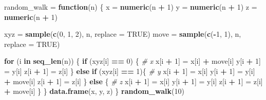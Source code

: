 \documentclass[
]{article}
\newenvironment{Shaded}{\begin{snugshade}}{\end{snugshade}}
\newcommand{\CommentTok}[1]{\textcolor[rgb]{0.56,0.35,0.01}{\textit{#1}}}
\newcommand{\ControlFlowTok}[1]{\textcolor[rgb]{0.13,0.29,0.53}{\textbf{#1}}}
\newcommand{\DataTypeTok}[1]{\textcolor[rgb]{0.13,0.29,0.53}{#1}}
\newcommand{\DecValTok}[1]{\textcolor[rgb]{0.00,0.00,0.81}{#1}}
\newcommand{\KeywordTok}[1]{\textcolor[rgb]{0.13,0.29,0.53}{\textbf{#1}}}
\newcommand{\NormalTok}[1]{#1}
\newcommand{\OperatorTok}[1]{\textcolor[rgb]{0.81,0.36,0.00}{\textbf{#1}}}
\newcommand{\OtherTok}[1]{\textcolor[rgb]{0.56,0.35,0.01}{#1}}
\newcommand{\StringTok}[1]{\textcolor[rgb]{0.31,0.60,0.02}{#1}}
\begin{document}
\begin{Shaded}
\begin{Highlighting}[]
\NormalTok{random\_walk =}\StringTok{ }\ControlFlowTok{function}\NormalTok{(n) \{}
\NormalTok{   x =}\StringTok{ }\KeywordTok{numeric}\NormalTok{(n }\OperatorTok{+}\StringTok{ }\DecValTok{1}\NormalTok{)}
\NormalTok{   y =}\StringTok{ }\KeywordTok{numeric}\NormalTok{(n }\OperatorTok{+}\StringTok{ }\DecValTok{1}\NormalTok{)}
\NormalTok{   z =}\StringTok{ }\KeywordTok{numeric}\NormalTok{(n }\OperatorTok{+}\StringTok{ }\DecValTok{1}\NormalTok{)}

\NormalTok{   xyz =}\StringTok{ }\KeywordTok{sample}\NormalTok{(}\KeywordTok{c}\NormalTok{(}\DecValTok{0}\NormalTok{, }\DecValTok{1}\NormalTok{, }\DecValTok{2}\NormalTok{), n, }\DataTypeTok{replace =} \OtherTok{TRUE}\NormalTok{)}
\NormalTok{   move =}\StringTok{ }\KeywordTok{sample}\NormalTok{(}\KeywordTok{c}\NormalTok{(}\OperatorTok{{-}}\DecValTok{1}\NormalTok{, }\DecValTok{1}\NormalTok{), n, }\DataTypeTok{replace =} \OtherTok{TRUE}\NormalTok{)}

   \ControlFlowTok{for}\NormalTok{ (i }\ControlFlowTok{in} \KeywordTok{seq\_len}\NormalTok{(n)) \{}
      \ControlFlowTok{if}\NormalTok{ (xyz[i] }\OperatorTok{==}\StringTok{ }\DecValTok{0}\NormalTok{) \{ }\CommentTok{\# x}
\NormalTok{         x[i }\OperatorTok{+}\StringTok{ }\DecValTok{1}\NormalTok{] =}\StringTok{ }\NormalTok{x[i] }\OperatorTok{+}\StringTok{ }\NormalTok{move[i]}
\NormalTok{         y[i }\OperatorTok{+}\StringTok{ }\DecValTok{1}\NormalTok{] =}\StringTok{ }\NormalTok{y[i]}
\NormalTok{         z[i }\OperatorTok{+}\StringTok{ }\DecValTok{1}\NormalTok{] =}\StringTok{ }\NormalTok{z[i]}
\NormalTok{   \} }\ControlFlowTok{else} \ControlFlowTok{if}\NormalTok{ (xyz[i] }\OperatorTok{==}\StringTok{ }\DecValTok{1}\NormalTok{)\{ }\CommentTok{\# y}
\NormalTok{         x[i }\OperatorTok{+}\StringTok{ }\DecValTok{1}\NormalTok{] =}\StringTok{ }\NormalTok{x[i]}
\NormalTok{         y[i }\OperatorTok{+}\StringTok{ }\DecValTok{1}\NormalTok{] =}\StringTok{ }\NormalTok{y[i] }\OperatorTok{+}\StringTok{ }\NormalTok{move[i]}
\NormalTok{         z[i }\OperatorTok{+}\StringTok{ }\DecValTok{1}\NormalTok{] =}\StringTok{ }\NormalTok{z[i]}
\NormalTok{   \} }\ControlFlowTok{else}\NormalTok{ \{ }\CommentTok{\# z}
\NormalTok{         x[i }\OperatorTok{+}\StringTok{ }\DecValTok{1}\NormalTok{] =}\StringTok{ }\NormalTok{x[i]}
\NormalTok{         y[i }\OperatorTok{+}\StringTok{ }\DecValTok{1}\NormalTok{] =}\StringTok{ }\NormalTok{y[i]}
\NormalTok{         z[i }\OperatorTok{+}\StringTok{ }\DecValTok{1}\NormalTok{] =}\StringTok{ }\NormalTok{z[i] }\OperatorTok{+}\StringTok{ }\NormalTok{move[i]}
\NormalTok{   \}}
\NormalTok{   \}}
   \KeywordTok{data.frame}\NormalTok{(x, y, z)}
\NormalTok{\}}
\KeywordTok{random\_walk}\NormalTok{(}\DecValTok{10}\NormalTok{)}
\end{Highlighting}
\end{Shaded}
\end{document}
